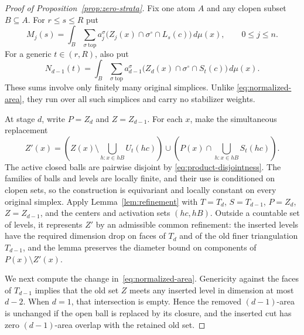 \begin{proof}[Proof of Proposition~\ref{prop:zero-strata}]
Fix one atom $A$ and any clopen subset $B\subseteq A$.  For $r\le s\le R$
put
\begin{equation}\label{eq:local-areas}
 M_j(s)=\int_B\sum_{\sigma\ \mathrm{top}}
 a_j^\sigma\bigl(Z_j(x)\cap\sigma^\circ\cap L_s(c)\bigr)\,d\mu(x),
 \qquad 0\le j\le n.
\end{equation}
For a generic $t\in(r,R)$, also put
\[
 N_{d-1}(t)=\int_B\sum_{\sigma\ \mathrm{top}}
 a_{d-1}^\sigma
 \bigl(Z_d(x)\cap\sigma^\circ\cap S_t(c)\bigr)\,d\mu(x).
\]
These sums involve only finitely many original simplices.  Unlike
\eqref{eq:normalized-area}, they run over all such simplices and carry no
stabilizer weights.

At stage $d$, write $P=Z_d$ and $Z=Z_{d-1}$.  For each $x$, make the
simultaneous replacement
\begin{equation}\label{eq:local-replacement}
 Z'(x)=
 \left(Z(x)\setminus\bigcup_{h:x\in hB}U_t(hc)\right)
 \cup
 \left(P(x)\cap\bigcup_{h:x\in hB}S_t(hc)\right).
\end{equation}
The active closed balls are pairwise disjoint by
\eqref{eq:product-disjointness}.  The families of balls and levels are
locally finite, and their use is conditioned on clopen sets, so the
construction is equivariant and locally constant on every original
simplex.  Apply Lemma~\ref{lem:refinement} with $T=T_d$,
$S=T_{d-1}$, $P=Z_d$, $Z=Z_{d-1}$, and the centers and activation
sets $(hc,hB)$.  Outside a countable set of levels, it represents
$Z'$ by an admissible common refinement: the inserted levels have
the required dimension drop on faces of $T_d$ and of the old finer
triangulation $T_{d-1}$, and the lemma preserves the diameter bound
on components of $P(x)\setminus Z'(x)$.

We next compute the change in~\eqref{eq:normalized-area}.  Genericity
against the faces of $T_{d-1}$ implies that the old set $Z$ meets any
inserted level in dimension at most $d-2$.  When $d=1$, that intersection
is empty.  Hence the removed $(d-1)$-area is unchanged if the open ball is
replaced by its closure, and the inserted cut has zero $(d-1)$-area
overlap with the retained old set.


\end{proof}
